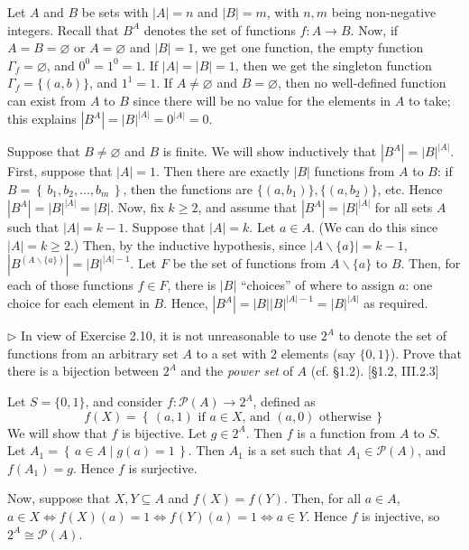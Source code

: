 \documentclass[12pt,letterpaper,boxed]{hmcpset}
\newcommand{\set}[1]{\left\{\,#1\,\right\}}
\newcommand{\abs}[1]{\left|#1\right|}
\begin{document}
\begin{solution}
	Let $A$ and $B$ be sets with $\abs{A}=n$ and $\abs{B}=m$, with $n,m$ being
	non-negative integers. Recall that $B^A$ denotes the set of functions $f:A\to
	B$. Now, if $A=B=\varnothing$ or $A=\varnothing$ and $\abs{B}=1$, we get one
	function, the empty function $\Gamma_f = \varnothing$, and $0^0 = 1^0 = 1$. If
	$\abs{A} = \abs{B} = 1$, then we get the singleton function
	$\Gamma_f=\{(a,b)\}$, and $1^1 = 1$. If $A\neq\varnothing$ and $B=\varnothing$, then
	no well-defined function can exist from $A$ to $B$ since there will be no value
	for the elements in $A$ to take; this explains $\abs{B^A} = \abs{B}^{\abs{A}} =
	0^{\abs{A}} = 0$.
	
	Suppose that $B\neq\varnothing$ and $B$ is finite. We will show inductively that
	$\abs{B^A} = \abs{B}^{\abs{A}}$. First, suppose that $\abs{A} = 1$.  Then there
	are exactly $\abs{B}$ functions from $A$ to $B$: if $B=\set{b_1,b_2,\dots,b_m}$,
	then the functions are $\{(a,b_1)\}, \{(a,b_2)\}$, etc. Hence $\abs{B^A} =
	\abs{B}^{\abs{A}} = \abs{B}$.  Now, fix $k\geq 2$, and assume that $\abs{B^A} =
	\abs{B}^{\abs{A}}$ for all sets $A$ such that $\abs{A}=k-1$. Suppose that
	$\abs{A}=k$. Let $a\in A$. (We can do this since $\abs{A}=k\geq 2$.) Then, by
	the inductive hypothesis, since $\abs{A\backslash\{a\}}=k-1$,
	$\abs{B^{(A\backslash\{a\})}} = \abs{B}^{\abs{A}-1}$. Let $F$ be the set of
	functions from $A\backslash\{a\}$ to $B$.  Then, for each of those functions
	$f\in F$, there is $\abs{B}$ ``choices'' of where to assign $a$: one choice for
	each element in $B$. Hence, $\abs{B^A} = \abs{B}\abs{B}^{\abs{A}-1} =
	\abs{B}^{\abs{A}}$ as required.
\end{solution}


\begin{problem}[2.11]
	$\rhd$ In view of Exercise 2.10, it is not unreasonable to use $2^A$ to denote
	the set of functions from an arbitrary set $A$ to a set with $2$ elements (say
	$\{0,1\}$). Prove that there is a bijection between $2^A$ and the \textit{power
		set} of $A$ (cf. \S1.2). [\S1.2, III.2.3]
\end{problem}

\begin{solution}
	Let $S = \{0,1\}$, and consider $f:\mathcal{P}(A)\to 2^A$, defined as
	\[ f(X) = \set{(a,1) \text{ if $a\in X$, and }(a,0) \text{ otherwise}} \]
	We will show that $f$ is bijective. Let $g\in 2^A$. Then $f$ is a
	function from $A$ to $S$. Let $A_1 = \set{a\in A\mid g(a) = 1}$. Then $A_1$ is a
	set such that $A_1\in\mathcal{P}(A)$, and $f(A_1)=g$. Hence $f$ is surjective.
	
	Now, suppose that $X,Y\subseteq A$ and $f(X) = f(Y)$. Then, for all $a\in A$,
	$a\in X \iff f(X)(a) = 1 \iff f(Y)(a) = 1 \iff a\in Y$. Hence $f$ is injective,
	so $2^A\cong\mathcal{P}(A)$.
\end{solution}
\end{document}
